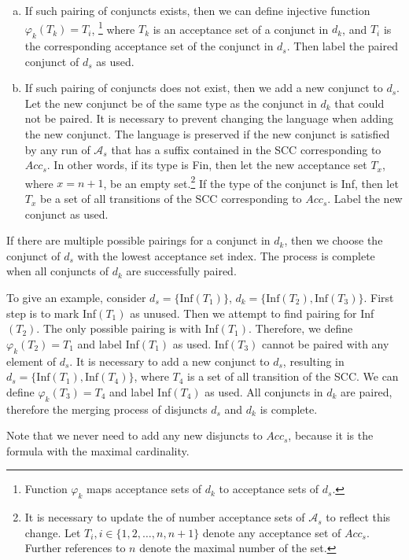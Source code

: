\documentclass[
  digital, %
  twoside, %
  table,   %
  lof,     %
  lot,     %
]{fithesis3}
\begin{document}
\begin{enumerate}[a)]
  \item If such pairing of conjuncts exists, then we can define injective function $\varphi_k (T_k) = T_i$, \footnote{Function $\varphi_k$ maps acceptance sets of $d_k$ to acceptance sets of $d_s$.} where $T_k$ is an acceptance set of a conjunct in $d_k$, and $T_i$ is the corresponding acceptance set of the conjunct in $d_s$. Then label the paired conjunct of $d_s$ as used.
  \item If such pairing of conjuncts does not exist, then we add a new conjunct to $d_s$. Let the new conjunct be of the same type as the conjunct in $d_k$ that could not be paired. It is necessary to prevent changing the language when adding the new conjunct. The language is preserved if the new conjunct is satisfied by any run of $\mathcal{A}_s$ that has a suffix contained in the SCC corresponding to $Acc_s$. In other words, if its type is Fin, then let the new acceptance set $T_x$, where $x = n + 1$, be an empty set.\footnote{It is necessary to update the of number acceptance sets of $\mathcal{A}_s$ to reflect this change. Let $T_i, i \in \{1,2, \dots, n, n+1\}$ denote any acceptance set of $Acc_s$. Further references to $n$ denote the maximal number of the set.} If the type of the conjunct is Inf, then let $T_x$ be a set of all transitions of the SCC corresponding to $Acc_s$. Label the new conjunct as used.
\end{enumerate}
If there are multiple possible pairings for a conjunct in $d_k$, then we choose the conjunct of $d_s$ with the lowest acceptance set index. The process is complete when all conjuncts of $d_k$ are successfully paired. 

To give an example, consider $d_s = \{\text{Inf}(T_1)\}$, $d_k = \{\text{Inf}(T_2), \text{Inf}(T_3)\}$. First step is to mark Inf$(T_1)$ as unused. Then we attempt to find pairing for Inf$(T_2)$. The only possible pairing is with Inf$(T_1)$. Therefore, we define $\varphi_k(T_2) = T_1$ and label Inf$(T_1)$ as used. Inf$(T_3)$ cannot be paired with any element of $d_s$. It is necessary to add a new conjunct to $d_s$, resulting in $d_s = \{\text{Inf}(T_1), \text{Inf}(T_4)\}$, where $T_4$ is a set of all transition of the SCC. We can define $\varphi_k(T_3) = T_4$ and label Inf$(T_4)$ as used. All conjuncts in $d_k$ are paired, therefore the merging process of disjuncts $d_s$ and $d_k$ is complete.

Note that we never need to add any new disjuncts to $Acc_s$, because it is the formula with the maximal cardinality.
\end{document}
